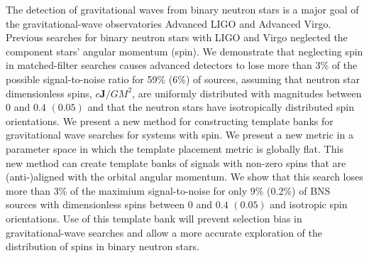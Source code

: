 
The detection of gravitational waves from binary neutron stars
is a major goal of the gravitational-wave observatories Advanced LIGO and
Advanced Virgo. Previous searches for binary neutron stars with LIGO and Virgo
neglected the component stars' angular momentum (spin).  We demonstrate that
neglecting spin in matched-filter searches causes advanced detectors
to lose more than 3\% of the possible signal-to-noise ratio for 59\% (6\%) of
sources, assuming that neutron star dimensionless spins, $c\mathbf{J}/GM^2$, are uniformly distributed
with magnitudes between $0$ and $0.4$ $(0.05)$ and that the neutron stars
have isotropically distributed spin orientations.
We present a new method for constructing template banks for gravitational
wave searches for systems with spin. We present a new metric in a parameter
space in which the template placement metric is globally flat.
This new method can create template banks of signals with
non-zero spins that are (anti-)aligned with the orbital angular momentum.  We show that this search loses more than
3\% of the maximium signal-to-noise for only 9\% (0.2\%) of BNS sources with dimensionless spins between $0$ and $0.4$ $(0.05)$ and isotropic spin orientations. Use of this
template bank will prevent selection bias in gravitational-wave searches and
allow a more accurate exploration of the distribution of spins in binary
neutron stars.

